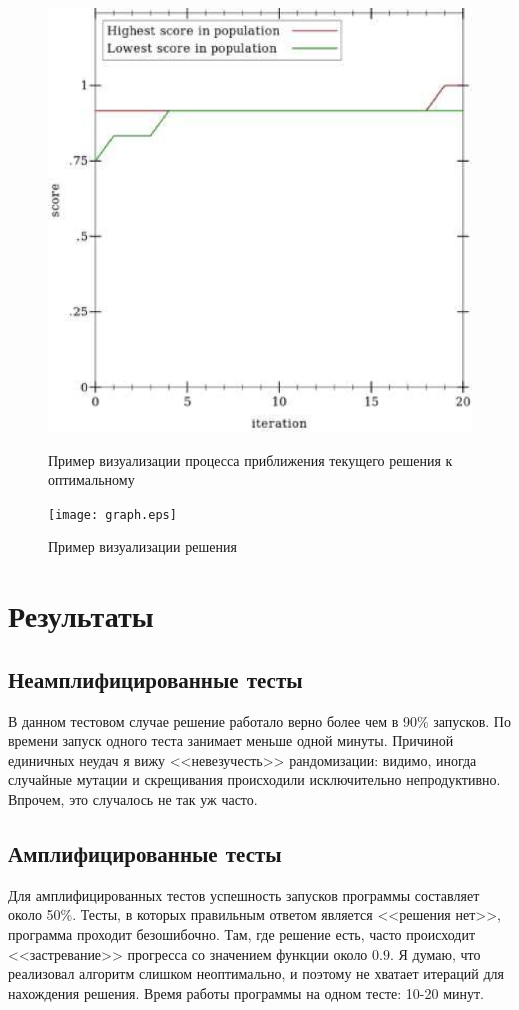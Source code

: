 \documentclass[12pt]{article}
\begin{document}
        \pagebreak
        \begin{figure}[b]
            \centering
            \includegraphics[scale=0.8]{plot.eps}
            \caption{Пример визуализации процесса приближения текущего решения к оптимальному}
            \texttt{[image: graph.eps]}
            \caption{Пример визуализации решения}
        \end{figure}

							
        \pagebreak

        \section{Результаты}

        \subsection{Неамплифицированные тесты}
        В данном тестовом случае решение работало верно более чем в 90\% запусков. По времени запуск одного теста занимает 
        меньше одной минуты. Причиной единичных неудач я вижу <<невезучесть>> рандомизации:
        видимо, иногда случайные мутации и скрещивания происходили исключительно непродуктивно. Впрочем, это случалось не так уж часто. 

        \subsection{Амплифицированные тесты}
        Для амплифицированных тестов успешность запусков программы составляет около 50\%. Тесты, в которых правильным ответом является <<решения нет>>, программа проходит безошибочно.
        Там, где решение есть, часто происходит <<застревание>> прогресса со значением функции около $0.9$. Я думаю, что реализовал алгоритм слишком неоптимально, и поэтому 
        не хватает итераций для нахождения решения. Время работы программы на одном тесте: 10-20 минут.
\end{document}
